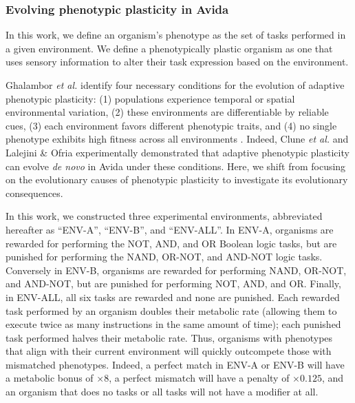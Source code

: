 \subsubsection{Evolving phenotypic plasticity in Avida}
\label{sec:methods:evolution-of-plasticity-in-avida}


In this work, we define an organism's phenotype as the set of tasks performed in a given environment.
We define a phenotypically plastic organism as one that uses sensory information to alter their task expression based on the environment.

Ghalambor \textit{et al.} identify four necessary conditions for the evolution of adaptive phenotypic plasticity: 
(1) populations experience temporal or spatial environmental variation,
(2) these environments are differentiable by reliable cues,
(3) each environment favors different phenotypic traits,
and (4) no single phenotype exhibits high fitness across all environments \citep{ghalambor_behavior_2010}.
Indeed, Clune \textit{et al.} \citep{clune_investigating_2007} and Lalejini \& Ofria \citep{lalejini_evolutionary_2016} experimentally demonstrated that adaptive phenotypic plasticity can evolve \textit{de novo} in Avida under these conditions.
Here, we shift from focusing on the evolutionary causes of phenotypic plasticity to investigate its evolutionary consequences.

In this work, we constructed three experimental environments, abbreviated hereafter as ``ENV-A'', ``ENV-B'', and ``ENV-ALL''.
In ENV-A, organisms are rewarded for performing the NOT, AND, and OR Boolean logic tasks, but are punished for performing the NAND, OR-NOT, and AND-NOT logic tasks.
Conversely in ENV-B, organisms are rewarded for performing NAND, OR-NOT, and AND-NOT, but are punished for performing NOT, AND, and OR.  
Finally, in ENV-ALL, all six tasks are rewarded and none are punished.
Each rewarded task performed by an organism doubles their metabolic rate (allowing them to execute twice as many instructions in the same amount of time); each punished task performed halves their metabolic rate.
Thus, organisms with phenotypes that align with their current environment will quickly outcompete those with mismatched phenotypes.  
Indeed, a perfect match in ENV-A or ENV-B will have a metabolic bonus of $\times{8}$, a perfect mismatch will have a penalty of $\times{0.125}$, and an organism that does no tasks or all tasks will not have a modifier at all. 

